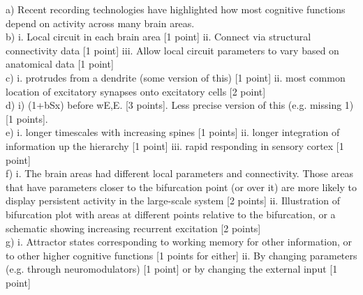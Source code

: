 \documentclass{cs-uob-exam}
\begin{document}
\begin{questions}
\begin{solution}
a) Recent recording technologies have highlighted how most cognitive functions depend on activity across many brain areas.\\
b) i. Local circuit in each brain area [1 point] ii. Connect via structural connectivity data [1 point] iii. Allow local circuit parameters to vary based on anatomical data [1 point]\\
c) i. protrudes from a dendrite (some version of this) [1 point] ii. most common location of excitatory synapses onto excitatory cells [2 point]\\
d)  i) (1+bSx) before wE,E. [3 points]. Less precise version of this (e.g. missing 1) [1 points].\\
e) i. longer timescales with increasing spines [1 points] ii. longer integration of information up the hierarchy [1 point] iii. rapid responding in sensory cortex [1 point]\\
f)  i. The brain areas had different local parameters and connectivity. Those areas that have parameters closer to the bifurcation point (or over it) are more likely to display persistent activity in the large-scale system [2 points] ii. Illustration of bifurcation plot with areas at different points relative to the bifurcation, or a schematic showing increasing recurrent excitation [2 points]\\
g) i. Attractor states corresponding to working memory for other information, or to other higher cognitive functions [1 points for either] ii. By changing parameters (e.g. through neuromodulators) [1 point] or by changing the external input [1 point] 
\end{solution}

\end{questions}
\end{document}
